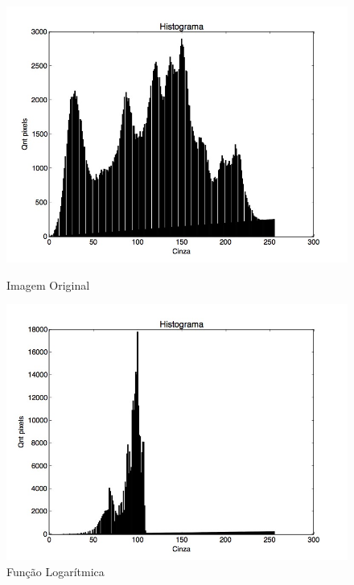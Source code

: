 \documentclass{article}
\begin{document}
\FloatBarrier
\begin{figure}[!htb]
\begin{minipage}[b]{0.45\linewidth}
\centering
\includegraphics[scale=0.25]{Histo_lena_B.jpg}
\caption{Imagem Original}
\label{fig:original}
\end{minipage}
\hspace{0.5cm}
\begin{minipage}[b]{0.45\linewidth}
\centering
\includegraphics[scale=0.25]{Histo_TransNLinearLog.jpg}
\caption{Função Logarítmica}
\label{fig:rota}
\end{minipage}
\end{figure}
\FloatBarrier
\end{document}
